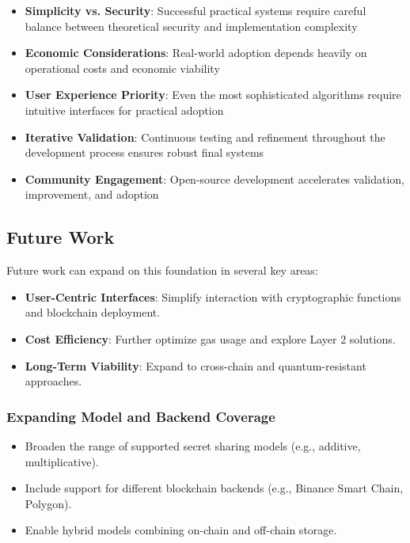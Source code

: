 \documentclass[12pt,a4paper]{article}
\begin{document}
\begin{itemize}[leftmargin=15pt]
    \item \textbf{Simplicity vs. Security}: Successful practical systems require careful balance between theoretical security and implementation complexity
    \item \textbf{Economic Considerations}: Real-world adoption depends heavily on operational costs and economic viability
    \item \textbf{User Experience Priority}: Even the most sophisticated algorithms require intuitive interfaces for practical adoption
    \item \textbf{Iterative Validation}: Continuous testing and refinement throughout the development process ensures robust final systems
    \item \textbf{Community Engagement}: Open-source development accelerates validation, improvement, and adoption
\end{itemize}
\subsection{Future Work}

Future work can expand on this foundation in several key areas:

\begin{itemize}
    \item \textbf{User-Centric Interfaces}: Simplify interaction with cryptographic functions and blockchain deployment.
    \item \textbf{Cost Efficiency}: Further optimize gas usage and explore Layer 2 solutions.
    \item \textbf{Long-Term Viability}: Expand to cross-chain and quantum-resistant approaches.
\end{itemize}

\subsubsection{Expanding Model and Backend Coverage}

\begin{itemize}
    \item Broaden the range of supported secret sharing models (e.g., additive, multiplicative).
    \item Include support for different blockchain backends (e.g., Binance Smart Chain, Polygon).
    \item Enable hybrid models combining on-chain and off-chain storage.
\end{itemize}
\end{document}
